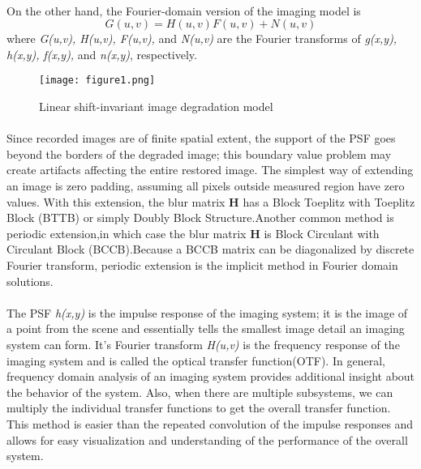 \documentclass[a4paper]{book}
\begin{document}
	\paragraph*{} On the other hand, the Fourier-domain version of the imaging model is
	\begin{equation}
	\label{eq3.3}
	G(u,v) = H(u,v)F(u,v) + N(u,v)
	\end{equation}
	where \textit{G(u,v), H(u,v), F(u,v),} and \textit{N(u,v)} are the Fourier transforms of \textit{g(x,y), h(x,y), f(x,y),} and \textit{n(x,y)}, respectively.
%
	\begin{figure}[h]
	\begin{center}
		\texttt{[image: figure1.png]}
		\caption{\small Linear shift-invariant image degradation model}
		\label{fig:1}
	\end{center}
	\end{figure}


	\paragraph*{}Since recorded images are of finite spatial extent, the support of the PSF goes beyond the borders of the degraded image; this boundary value problem may create artifacts affecting the entire restored image. The simplest way of extending an image is zero padding, assuming all pixels outside measured region have zero values. With this extension, the blur matrix \textbf{H} has a Block Toeplitz with Toeplitz Block (BTTB) or simply Doubly Block Structure.Another common method is periodic extension,in which case the blur matrix \textbf{H} is Block Circulant with Circulant Block (BCCB).Because a BCCB matrix can be diagonalized by discrete Fourier transform, periodic extension is the implicit method in Fourier domain solutions.


	\paragraph*{}The PSF \textit{h(x,y)} is the impulse response of the imaging system; it is the image of a point from the scene and essentially tells the smallest image detail an imaging system can form. It's Fourier transform \textit{H(u,v)} is the frequency response of the imaging system and is called the optical transfer function(OTF). In general, frequency domain analysis of an imaging system provides additional insight about the behavior of the system. Also, when there are multiple subsystems, we can multiply the individual transfer functions to get the overall transfer function. This method is easier than the repeated convolution of the impulse responses and allows for easy visualization and understanding of the performance of the overall system.
	
\end{document}
